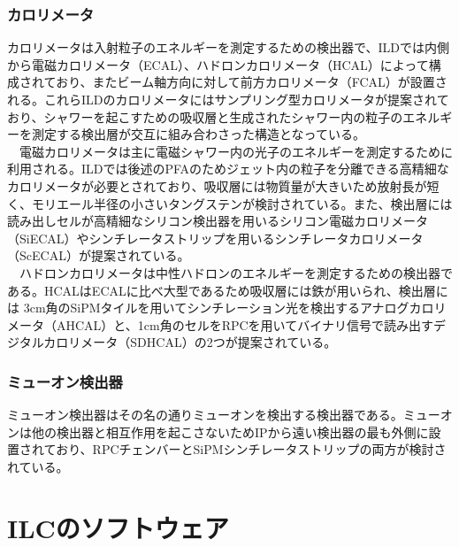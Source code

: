 \subsubsection{カロリメータ}
カロリメータは入射粒子のエネルギーを測定するための検出器で、ILDでは内側から電磁カロリメータ（ECAL）、ハドロンカロリメータ（HCAL）によって構成されており、またビーム軸方向に対して前方カロリメータ（FCAL）が設置される。これらILDのカロリメータにはサンプリング型カロリメータが提案されており、シャワーを起こすための吸収層と生成されたシャワー内の粒子のエネルギーを測定する検出層が交互に組み合わさった構造となっている。\\
　電磁カロリメータは主に電磁シャワー内の光子のエネルギーを測定するために利用される。ILDでは後述のPFAのためジェット内の粒子を分離できる高精細なカロリメータが必要とされており、吸収層には物質量が大きいため放射長が短く、モリエール半径の小さいタングステンが検討されている。また、検出層には読み出しセルが高精細なシリコン検出器を用いるシリコン電磁カロリメータ（SiECAL）やシンチレータストリップを用いるシンチレータカロリメータ（ScECAL）が提案されている。\\
　ハドロンカロリメータは中性ハドロンのエネルギーを測定するための検出器である。HCALはECALに比べ大型であるため吸収層には鉄が用いられ、検出層には 3cm角のSiPMタイルを用いてシンチレーション光を検出するアナログカロリメータ（AHCAL）と、1cm角のセルをRPCを用いてバイナリ信号で読み出すデジタルカロリメータ（SDHCAL）の2つが提案されている。
\subsubsection{ミューオン検出器}
ミューオン検出器はその名の通りミューオンを検出する検出器である。ミューオンは他の検出器と相互作用を起こさないためIPから遠い検出器の最も外側に設置されており、RPCチェンバーとSiPMシンチレータストリップの両方が検討されている。

\section{ILCのソフトウェア}
